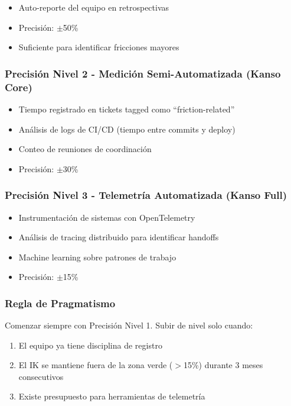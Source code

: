 \begin{itemize}
    \item Auto-reporte del equipo en retrospectivas
    \item Precisión: $\pm$50\%
    \item Suficiente para identificar fricciones mayores
\end{itemize}

\subsubsection{Precisión Nivel 2 - Medición Semi-Automatizada (Kanso Core)}

\begin{itemize}
    \item Tiempo registrado en tickets tagged como ``friction-related''
    \item Análisis de logs de CI/CD (tiempo entre commits y deploy)
    \item Conteo de reuniones de coordinación
    \item Precisión: $\pm$30\%
\end{itemize}

\subsubsection{Precisión Nivel 3 - Telemetría Automatizada (Kanso Full)}

\begin{itemize}
    \item Instrumentación de sistemas con OpenTelemetry
    \item Análisis de tracing distribuido para identificar handoffs
    \item Machine learning sobre patrones de trabajo
    \item Precisión: $\pm$15\%
\end{itemize}

\subsubsection{Regla de Pragmatismo}

Comenzar siempre con Precisión Nivel 1. Subir de nivel solo cuando:

\begin{enumerate}
    \item El equipo ya tiene disciplina de registro
    \item El IK se mantiene fuera de la zona verde ($>$15\%) durante 3 meses consecutivos
    \item Existe presupuesto para herramientas de telemetría
\end{enumerate}